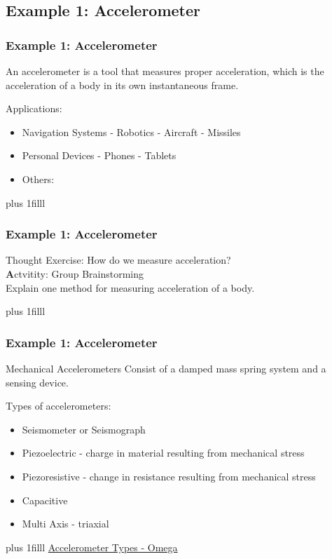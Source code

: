 \documentclass[fleqn]{beamer} %
\newcommand{\sectionIIsubsectionIIItitle}{Example 1: Accelerometer}
\newcommand{\btVFill}{\vskip0pt plus 1filll}
\begin{document}
		\subsection{\sectionIIsubsectionIIItitle}\label{sectionIIsubsectionIII}

			\begin{frame}
				\frametitle{\sectionIIsubsectionIIItitle}
				An accelerometer is a tool that measures proper acceleration, which is the acceleration of a body in its own instantaneous frame.

				Applications:
				\begin{itemize}
					\item Navigation Systems - Robotics - Aircraft - Missiles
					\item Personal Devices - Phones - Tablets
					\item Others:
				\end{itemize}                                

				\btVFill
				
			\end{frame}

			\begin{frame}
				\frametitle{\sectionIIsubsectionIIItitle}

			 	Thought Exercise: How do we measure acceleration? \vspace{10mm}\\                      
	
			 	{\textbf Actvitity:} Group Brainstorming \\
				Explain one method for measuring acceleration of a body.

			    \btVFill

			\end{frame}

			\begin{frame}
			\frametitle{\sectionIIsubsectionIIItitle}

				Mechanical Accelerometers Consist of a damped mass spring system and a sensing device.
	
			 	Types of accelerometers:

			 	\begin{itemize}
			 		
			 		\item Seismometer or Seismograph

			 		\item Piezoelectric - charge in material resulting from mechanical stress

			 		\item Piezoresistive - change in resistance resulting from mechanical stress

			 		\item Capacitive 

			 		\item Multi Axis - triaxial 

			 	\end{itemize}

			 
			    \btVFill
			    {\tiny \href{https://www.omega.com/en-us/resources/accelerometers}{Accelerometer Types - Omega} }

			\end{frame}
\end{document}
